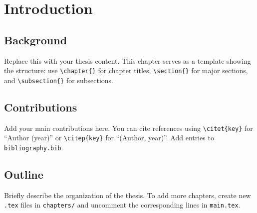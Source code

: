 \documentclass[../main.tex]{subfiles}
\begin{document}
\chapter{Introduction}\label{ch:intro}

\section{Background}

Replace this with your thesis content. This chapter serves as a template showing the structure: use \verb|\chapter{}| for chapter titles, \verb|\section{}| for major sections, and \verb|\subsection{}| for subsections.

\section{Contributions}

Add your main contributions here. You can cite references using \verb|\citet{key}| for ``Author (year)'' or \verb|\citep{key}| for ``(Author, year)''. Add entries to \texttt{bibliography.bib}.

\section{Outline}

Briefly describe the organization of the thesis. To add more chapters, create new \texttt{.tex} files in \texttt{chapters/} and uncomment the corresponding \verb|| lines in \texttt{main.tex}.


\end{document}
